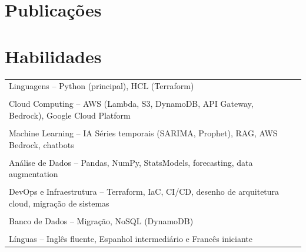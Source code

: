 \documentclass[a4paper,12pt]{article}
\begin{document}
\section{Publicações}
\begin{refsection}
\nocite{*}
\printbibliography[heading=none]
\end{refsection}

\section{Habilidades}
\begin{tabularx}{\linewidth}{@{}l X@{}}
Linguagens -- \normalsize{Python (principal), HCL (Terraform)} \\ \\
Cloud Computing -- \normalsize{AWS (Lambda, S3, DynamoDB, API Gateway, Bedrock), Google Cloud Platform} \\ \\
Machine Learning -- IA \normalsize{Séries temporais (SARIMA, Prophet), RAG, AWS Bedrock, chatbots}\\ \\
Análise de Dados -- \normalsize{Pandas, NumPy, StatsModels, forecasting, data augmentation}\\ \\
DevOps e Infraestrutura -- \normalsize{Terraform, IaC, CI/CD, desenho de arquitetura cloud, migração de sistemas}\\ \\
Banco de Dados -- \normalsize{Migração, NoSQL (DynamoDB)}\\ \\
Línguas -- \normalsize{Inglês fluente, Espanhol intermediário e Francês iniciante}
\end{tabularx}

\vfill
{}
\end{document}
